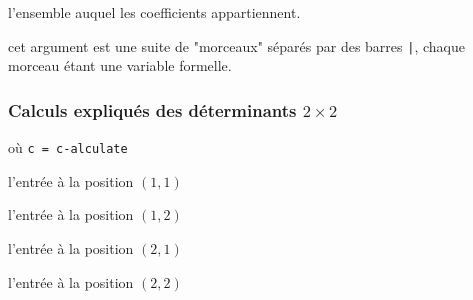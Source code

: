 \documentclass[12pt,a4paper]{article}
\theoremstyle{definition}
\newcommand\extraspace{
	\vspace{0.25em}
}
\newcommand\mwhyprefix[2]{%
	\texttt{#1 = #1-#2}%
}
\begin{document}


\extraspace



 l'ensemble auquel les coefficients appartiennent.

 cet argument est une suite de "morceaux" séparés par des barres \verb+|+, chaque morceau étant une variable formelle.
\subsubsection{\texorpdfstring{Calculs expliqués des déterminants $2 \times 2$}%
                          {Calculs expliqués des déterminants 3x3}}

  où \quad \mwhyprefix{c}{alculate}

 l'entrée à la position $(1, 1)$

 l'entrée à la position $(1, 2)$

\extraspace

 l'entrée à la position $(2, 1)$

 l'entrée à la position $(2, 2)$                   
\end{document}
